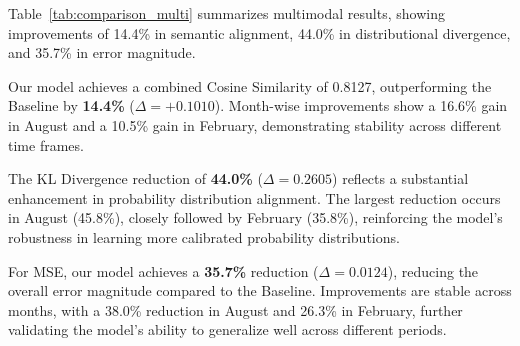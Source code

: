 Table~\ref{tab:comparison_multi} summarizes multimodal results, showing improvements of 14.4\% in semantic alignment, 44.0\% in distributional divergence, and 35.7\% in error magnitude.

\begin{table}[h]
    \centering
    \caption{Performance comparison between Baseline and Our Model for multimodal experiments. The Baseline predictions are obtained by averaging the outputs from the two unimodal Baseline models. Higher values are better for $\uparrow$, and lower values are better for $\downarrow$. Bold values indicate combined scores.}
    \label{tab:comparison_multi}
\end{table}

Our model achieves a combined Cosine Similarity of 0.8127, outperforming the Baseline by \textbf{14.4\%} ($\Delta = +0.1010$). Month-wise improvements show a 16.6\% gain in August and a 10.5\% gain in February, demonstrating stability across different time frames.
\newline

The KL Divergence reduction of \textbf{44.0\%} ($\Delta = 0.2605$) reflects a substantial enhancement in probability distribution alignment. The largest reduction occurs in August (45.8\%), closely followed by February (35.8\%), reinforcing the model's robustness in learning more calibrated probability distributions.
\newline

For MSE, our model achieves a \textbf{35.7\%} reduction ($\Delta = 0.0124$), reducing the overall error magnitude compared to the Baseline. Improvements are stable across months, with a 38.0\% reduction in August and 26.3\% in February, further validating the model’s ability to generalize well across different periods.


